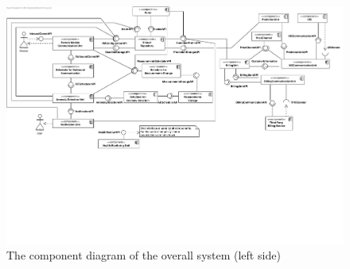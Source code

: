 \begin{figure}[H]
	\begin{centering}
		\includegraphics[height=\textwidth,angle=-90]{figs/left-final-component.pdf}
		\caption{The component diagram of the overall system (left side)}
		\label{fig:final-components-left}
	\end{centering}
\end{figure}

